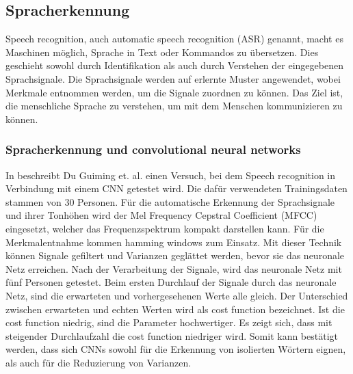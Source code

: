 \subsection{Spracherkennung}
Speech recognition, auch automatic speech recognition (ASR) genannt, macht es Maschinen möglich, Sprache in Text oder Kommandos zu übersetzen. Dies geschieht sowohl durch Identifikation als auch durch Verstehen der eingegebenen Sprachsignale. Die Sprachsignale werden auf erlernte Muster angewendet, wobei Merkmale entnommen werden, um die Signale zuordnen zu können. Das Ziel ist, die menschliche Sprache zu verstehen, um mit dem Menschen kommunizieren zu können.\cite{technology}\\

\subsubsection{Spracherkennung und convolutional neural networks}
In \cite{usingcnn} beschreibt Du Guiming et. al. einen Versuch, bei dem Speech recognition in Verbindung mit einem CNN getestet wird. Die dafür verwendeten Trainingsdaten stammen von 30 Personen. Für die automatische Erkennung der Sprachsignale und ihrer Tonhöhen wird der Mel Frequency Cepstral Coefficient (MFCC) \cite{MFCC} eingesetzt, welcher das Frequenzspektrum kompakt darstellen kann. Für die Merkmalentnahme kommen hamming windows zum Einsatz. Mit dieser Technik können Signale gefiltert und Varianzen geglättet werden, bevor sie das neuronale Netz erreichen. Nach der Verarbeitung der Signale, wird das neuronale Netz mit fünf Personen getestet. Beim ersten Durchlauf der Signale durch das neuronale Netz, sind die erwarteten und vorhergesehenen Werte alle gleich. Der Unterschied zwischen erwarteten und echten Werten wird als cost function bezeichnet. Ist die cost function niedrig, sind die Parameter hochwertiger. Es zeigt sich, dass mit steigender Durchlaufzahl die cost function niedriger wird. Somit kann bestätigt werden, dass sich CNNs sowohl für die Erkennung von isolierten Wörtern eignen, als auch für die Reduzierung von Varianzen.\cite{usingcnn}\\
\\
